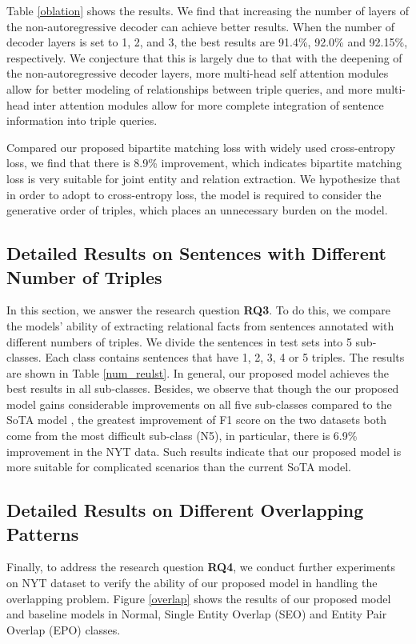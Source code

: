 \documentclass[letterpaper]{article} \usepackage{aaai21}  \usepackage{times}  \usepackage{helvet} \usepackage{courier}  \usepackage[hyphens]{url}  \usepackage{graphicx} \usepackage{amsfonts,amssymb}
\begin{document}
Table \ref{oblation} shows the results. We find that increasing the number of layers of the non-autoregressive decoder can achieve better results. When the number of decoder layers is set to 1, 2, and 3, the best results are 91.4\%, 92.0\% and 92.15\%, respectively. We conjecture that this is largely due to that with the deepening of the non-autoregressive decoder layers,  more multi-head self attention modules allow for better modeling of relationships between triple queries, and more multi-head inter attention modules allow for more complete integration of sentence information into triple queries. 

Compared our proposed bipartite matching loss with widely used cross-entropy loss, we find that there is 8.9\% improvement, which indicates bipartite matching loss is very suitable for joint entity and relation extraction. We hypothesize that in order to adopt to cross-entropy loss, the model is required to consider the generative order of triples, which places an unnecessary burden on the model.


\subsection{Detailed Results on Sentences with Different Number of Triples}
In this section, we answer the research question \textbf{RQ3}. To do this, we compare the models' ability of extracting relational facts from sentences annotated with different numbers of triples. We divide the sentences in test sets into 5 sub-classes. Each class contains sentences that have 1, 2, 3, 4 or 5 triples. The results are shown in Table \ref{num_reulst}. In general, our proposed model achieves the best results in all sub-classes. Besides, we observe that though the our proposed model gains considerable improvements on all five sub-classes compared to the SoTA model \cite{wei-etal-2020-novel}, the greatest improvement of F1 score on the two datasets both come from the most difficult sub-class (N5), in particular, there is 6.9\% improvement in the NYT data. Such results indicate that our proposed model is more suitable for complicated scenarios than the current SoTA model.
\subsection{Detailed Results on Different Overlapping Patterns}
Finally, to address  the research question \textbf{RQ4}, we conduct further experiments on NYT dataset to verify the ability of our proposed model in handling the overlapping problem.  Figure \ref{overlap} shows the results of our proposed model and baseline models in Normal, Single Entity Overlap (SEO) and Entity Pair Overlap (EPO) classes. 
\end{document}
